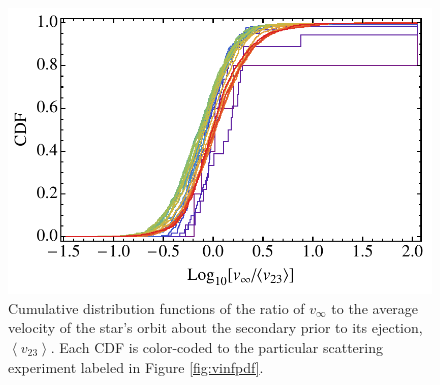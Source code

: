 \documentclass[a4paper,twocolumn]{emulateapj}
\begin{document}
\begin{figure}
\centering\includegraphics[width=0.9\linewidth,clip=true]{vratio}
\caption{Cumulative distribution functions of the ratio of $v_{\infty}$ to the average velocity of the star's orbit about the secondary prior to its ejection, $\left<v_{23}\right>$. Each CDF is color-coded to the particular scattering experiment labeled in Figure \ref{fig:vinfpdf}.}
\label{fig:vratio}
\end{figure}
\end{document}
